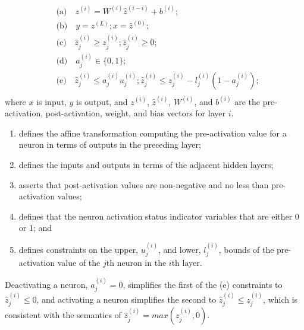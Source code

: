 \documentclass[oneside,11pt,dvipsnames]{book}
\numberwithin{equation}{section}
\theoremstyle{definition}
\theoremstyle{remark}
\begin{document}
\begin{equation}\label{eq:mip}
    \begin{aligned}
        &\mbox{(a)}\quad z^{(i)} = W^{(i)} \hat{z}^{(i-i)} + b^{(i)}; \\
        &\mbox{(b)}\quad y = z^{(L)};  x = \hat{z}^{(0)}; \\
        &\mbox{(c)}\quad \hat{z}_j^{(i)} \ge {z}_j^{(i)}; \hat{z}_j^{(i)} \ge 0; \\
        &\mbox{(d)}\quad a_j^{(i)} \in \{ 0, 1\} ;\\
        &\mbox{(e)}\quad \hat{z}_j^{(i)} \le {a}_j^{(i)} {u}_j^{(i)}; \hat{z}_j^{(i)} \le {z}_j^{(i)} - {l}_j^{(i)}(1 - {a}_j^{(i)}); \\
    \end{aligned}
\end{equation}
where $x$ is input, $y$ is output, and $z^{(i)}$, $\hat{z}^{(i)}$, $W^{(i)}$, and $b^{(i)}$ are the pre-activation, post-activation, weight, and bias vectors for layer $i$. 
\begin{enumerate}[label=(\alph*)]
    \item defines the affine transformation computing the pre-activation value for a neuron in terms of outputs in the preceding layer;
    \item defines the inputs and outputs in terms of the adjacent hidden layers;
    \item asserts that post-activation values are non-negative and no less than pre-activation values;
    \item defines that the neuron activation status indicator variables that are either 0 or 1; and
    \item defines constraints on the upper, $u_j^{(i)}$, and lower, $l_j^{(i)}$, bounds of the pre-activation value of the $j$th neuron in the $i$th layer.
\end{enumerate}
Deactivating a neuron, $a_j^{(i)} = 0$, simplifies the first of the (e) constraints to $\hat{z}_j^{(i)} \le 0$, and activating a neuron simplifies the second to $\hat{z}_j^{(i)} \le z_j^{(i)}$, which is consistent with the semantics of $\hat{z}_j^{(i)} = max(z_j^{(i)},0)$.
\end{document}
